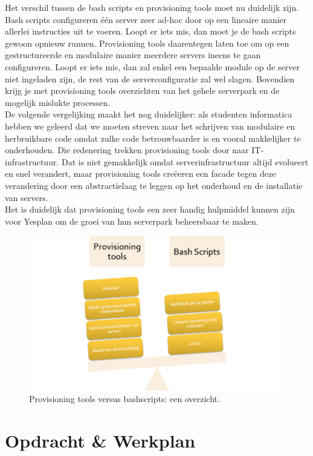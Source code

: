 \documentclass[a4paper,11pt]{article}
\theoremstyle{definition}
\begin{document}
\noindent Het verschil tussen de bash scripts en provisioning tools moet nu 
duidelijk zijn. Bash scripts configureren één server zeer ad-hoc door op een 
lineaire manier allerlei instructies uit te voeren. Loopt er iets mis, dan moet 
je de bash scripts gewoon opnieuw runnen. Provisioning tools daarentegen laten 
toe om op een gestructureerde en modulaire manier meerdere servers ineens te 
gaan configureren. Loopt er iets mis, dan zal enkel een bepaalde module op de 
server niet ingeladen zijn, de rest van de serverconfiguratie zal wel slagen. 
Bovendien krijg je met provisioning tools overzichten van het gehele serverpark 
en de mogelijk mislukte processen. \\

\noindent  De volgende vergelijking maakt het nog duidelijker: als studenten 
informatica hebben we geleerd dat we moeten streven naar het schrijven van modulaire en herbruikbare code omdat zulke code
betrouwbaarder is en vooral makkelijker te onderhouden. Die redenering trekken 
provisioning tools door naar IT-infrastructuur. Dat is niet gemakkelijk omdat 
serverinfrastructuur altijd evolueert en snel verandert, maar provisioning tools creëeren een facade 
tegen deze verandering door een abstractielaag te leggen op het onderhoud en de installatie van servers. \\

\noindent Het is duidelijk dat provisioning tools een 
zeer handig hulpmiddel kunnen zijn voor Yesplan om de groei van hun serverpark 
beheersbaar te maken.
\begin{figure}[h!]
  \centering
  \includegraphics[scale=0.5]{overzicht.pdf}\caption{Provisioning tools versus bashscripts: een overzicht.}\label{3}
\end{figure}
\newpage
\section{Opdracht \& Werkplan}
\end{document}
